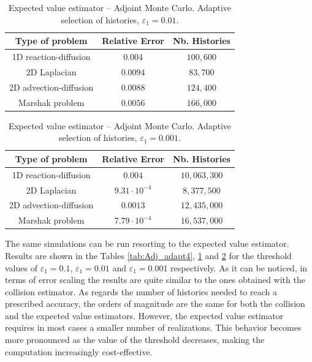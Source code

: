 \documentclass[times]{nlaauth}
\begin{document}
\begin{table}[!t]
\centering
\begin{tabular}{|c|c|c|}
\hline
\textbf{Type of problem} & \textbf{Relative Error} &\textbf{Nb. Histories}\\
\hline
1D reaction-diffusion & $0.004$ & $100,600$\\
\hline
2D Laplacian & $0.0094$ & $83,700$\\
\hline
2D advection-diffusion & $0.0088$  & $124,400$\\
\hline
Marshak problem & $0.0056$ & $166,000$\\
\hline
\end{tabular}
\caption{Expected value estimator -- Adjoint Monte Carlo. Adaptive selection of histories,
$\varepsilon_1=0.01.$}
\label{tab:Adj_adapt5}
\end{table}



\begin{table}[!t]
\centering
\begin{tabular}{|c|c|c|}
\hline
\textbf{Type of problem} & \textbf{Relative Error} &\textbf{Nb. Histories}\\
\hline
1D reaction-diffusion & $0.004$ & $10,063,300$\\
\hline
2D Laplacian & $ 9.31 \cdot 10^{-4} $ & $ 8,377,500 $\\
\hline
2D advection-diffusion & $ 0.0013 $  & $ 12,435,000 $\\
\hline
Marshak problem & $7.79 \cdot 10^{-4}$ & $16,537,000$\\
\hline
\end{tabular}
\caption{Expected value estimator -- Adjoint Monte Carlo. Adaptive selection of histories,
$\varepsilon_1=0.001.$}
\label{tab:Adj_adapt6}
\end{table}

The same simulations can be run resorting to the expected value
estimator. Results are shown in the Tables \ref{tab:Adj_adapt4},
\ref{tab:Adj_adapt5} and \ref{tab:Adj_adapt6} for the threshold values of
$\varepsilon_1=0.1$, $\varepsilon_1=0.01$ and $\varepsilon_1=0.001$
respectively. As it can be noticed, in terms of error scaling the results are
quite similar to the ones obtained with the collision estimator. As regards
the number of histories needed to reach a prescribed accuracy, the
orders of magnitude are the same for both the collision and the
expected value estimators. However, the expected value estimator requires
in most cases a smaller number of realizations. This behavior becomes more
pronounced as the value of
the threshold decreases, making the computation increasingly cost-effective.
\end{document}
